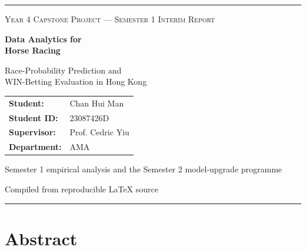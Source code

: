 \documentclass[11pt,a4paper]{article}
\begin{document}
\hypersetup{pageanchor=false}

\begin{titlepage}
\thispagestyle{empty}
\vspace*{8mm}
{\color{navy}\rule{\textwidth}{2.2pt}}
\vspace{12mm}
\begin{center}
    {\small\scshape\color{midgrey} Year 4 Capstone Project --- Semester 1 Interim Report\par}
    \vspace{9mm}
    {\Huge\bfseries\color{navy} Data Analytics for\\[2mm] Horse Racing\par}
    \vspace{6mm}
    {\Large\color{ink} Race-Probability Prediction and\\WIN-Betting Evaluation in Hong Kong\par}
    \vspace{12mm}
    \begin{tcolorbox}[width=0.86\textwidth,colback=soft,colframe=navy,arc=2mm,boxrule=0.8pt]
    \centering
    \begin{tabular}{ll}
        \textbf{Student:} & Chan Hui Man \\
        \textbf{Student ID:} & 23087426D \\
        \textbf{Supervisor:} & Prof. Cedric Yiu \\
        \textbf{Department:} & AMA \\
    \end{tabular}
    \end{tcolorbox}
    \vfill
    {\small\color{midgrey} Semester 1 empirical analysis and the Semester 2 model-upgrade programme\par}
    \vspace{3mm}
    {\small\color{midgrey} Compiled from reproducible \LaTeX{} source\par}
    \vspace{8mm}
    {\color{navy}\rule{0.55\textwidth}{0.8pt}}
\end{center}
\vfill
\end{titlepage}
\hypersetup{pageanchor=true}

\setcounter{page}{1}
\section*{Abstract}

\clearpage

\tableofcontents
\clearpage
\begingroup
\small
{}
\listoffigures
\listoftables
\endgroup
\clearpage

\setcounter{page}{1}









\clearpage
\begingroup
\small
{}
\setlength{\parskip}{0.25em}

\endgroup

\clearpage
\appendix

\end{document}
